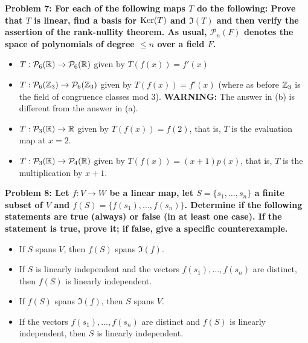 \documentclass[11pt]{amsart}
\begin{document}
\skv
\bf{Problem 7: }\rm For each of the following maps $T$ do the following:
Prove that $T$ is linear,  find a basis for ${\rm Ker}(T)$ and $\Im(T)$ and then verify the assertion of the rank-nullity theorem. As usual, $\mathcal P_n(F)$ denotes the space of polynomials of degree $\leq n$ over 
a field $F$.
\begin{itemize}
\item[(a)] $T: \mathcal  P_6({\mathbb R})\to \mathcal  P_6({\mathbb R})$ given by $T(f(x))=f'(x)$
\item[(b)] $T: \mathcal  P_6({\mathbb Z}_3)\to \mathcal  P_6({\mathbb Z}_3)$ given by $T(f(x))=f'(x)$
(where as before ${\mathbb Z}_3$ is the field of congruence classes mod $3$).
{\bf WARNING:} The answer in (b) is different from the answer in (a).
\item[(c)] $T: \mathcal  P_3({\mathbb R})\to {\mathbb R}$ given by $T(f(x))=f(2)$, that is,
$T$ is the evaluation map at $x=2$.
\item[(d) ] $T: \mathcal  P_3({\mathbb R})\to \mathcal  P_4({\mathbb R})$ given by $T(f(x))=(x+1)p(x)$,
that is, $T$ is the multiplication by $x+1$.
\end{itemize}
\skv
\bf{Problem 8: }\rm Let $f:V\to W$ be a linear map, let $S=\{s_1,\ldots, s_n\}$ a finite subset of $V$ and $f(S)=\{f(s_1),\ldots, f(s_n)\}$.
Determine if the following 
statements are true (always) or false (in at least one case). If the statement is true, prove it; if false, give a specific counterexample.
\begin{itemize}
\item[(a)] If $S$ spans $V$, then $f(S)$ spans $\Im(f)$.
\item[(b)] If $S$ is linearly independent and the vectors $f(s_1),\ldots, f(s_n)$ are distinct, then $f(S)$ is linearly independent.
\item[(c)] If $f(S)$ spans $\Im(f)$, then $S$ spans $V$.
\item[(d)] If  the vectors $f(s_1),\ldots, f(s_n)$ are distinct and $f(S)$ is linearly independent, then $S$ is linearly independent.
\end{itemize}
\end{document}

